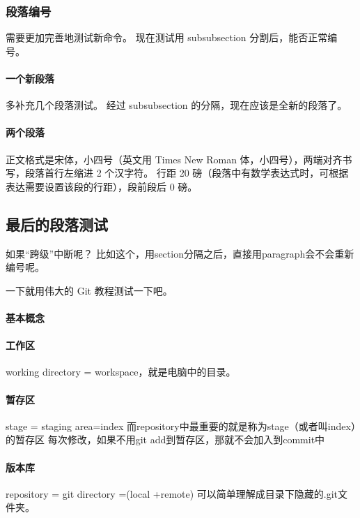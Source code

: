 \documentclass[../Main/thesis]{subfiles}
\begin{document}
\subsubsection{段落编号}

需要更加完善地测试新命令。
现在测试用 subsubsection 分割后，能否正常编号。

\paragraph{一个新段落}

多补充几个段落测试。
经过 subsubsection 的分隔，现在应该是全新的段落了。

\paragraph{两个段落} \label{par:second}

正文格式是宋体，小四号（英文用 Times New Roman 体，小四号），两端对齐书写，段落首行左缩进 2 个汉字符。
行距 20 磅（段落中有数学表达式时，可根据表达需要设置该段的行距），段前段后 0 磅。

\subsection{最后的段落测试} \label{ssc:lastpar}

如果“跨级”中断呢？
比如这个，用section分隔之后，直接用paragraph会不会重新编号呢。

一下就用伟大的 Git 教程测试一下吧。

\paragraph{基本概念} \label{par:git-concept}

\paragraph{工作区}
working directory = workspace，就是电脑中的目录。

\paragraph{暂存区}
stage = staging area=index
而repository中最重要的就是称为stage（或者叫index）的暂存区
每次修改，如果不用git add到暂存区，那就不会加入到commit中

\paragraph{版本库}
repository = git directory =(local +remote)
可以简单理解成目录下隐藏的.git文件夹。
\end{document}
